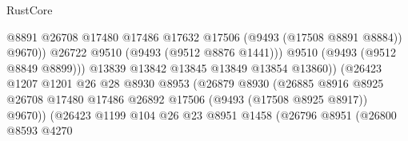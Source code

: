 \begin{lexlean}{RustCore}
\begin{coremodule}
                                                  @8891
                                                  @26708
                                                  @17480
                                                  @17486
                                                  @17632
                                                  @17506
                                                  (@9493 (@17508 @8891 @8884))
                                                  @9670))
                                              @26722
                                              @9510
                                              (@9493 (@9512 @8876 @1441)))
                                            @9510
                                            (@9493 (@9512 @8849 @8899)))
                                          @13839
                                          @13842
                                          @13845
                                          @13849
                                          @13854
                                          @13860))
                                      (@26423
                                        @1207
                                        @1201
                                        @26
                                        @28
                                        @8930
                                        @8953
                                        (@26879
                                          @8930
                                          (@26885
                                            @8916
                                            @8925
                                            @26708
                                            @17480
                                            @17486
                                            @26892
                                            @17506
                                            (@9493 (@17508 @8925 @8917))
                                            @9670))
                                        (@26423
                                          @1199
                                          @104
                                          @26
                                          @23
                                          @8951
                                          @1458
                                          (@26796
                                            @8951
                                            (@26800
                                              @8593
                                              @4270

\end{coremodule}
\end{lexlean}
